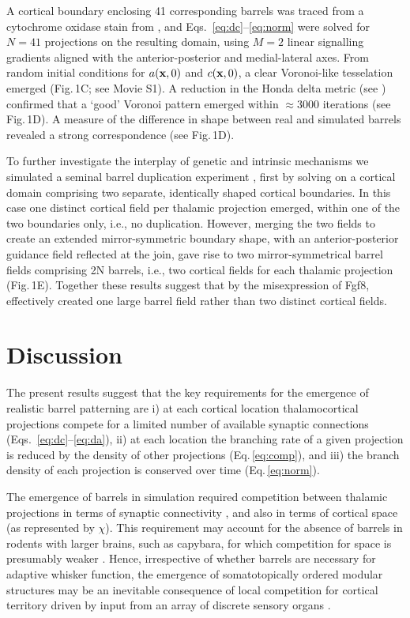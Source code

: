 \documentclass[9pt,lineno]{elife}
\begin{document}
A cortical boundary enclosing 41 corresponding barrels was traced from a
cytochrome oxidase stain from \cite{zheng_signal_2001}, and
Eqs.~\ref{eq:dc}--\ref{eq:norm} were solved for $N=41$ projections on the
resulting domain, using $M=2$ linear signalling gradients aligned with the
anterior-posterior and medial-lateral axes. From random initial conditions for
$a({\bf x},0)$ and $c({\bf x},0)$, a clear Voronoi-like tesselation emerged
(Fig.\,1C; see Movie S1). A reduction in the Honda delta metric (see
\citealp{senft_mouse_1991}) confirmed that a `good' Voronoi pattern emerged
within $\approx 3000$ iterations (see Fig.\,1D). A measure of the difference
in shape between real and simulated barrels revealed a strong correspondence
(see Fig.\,1D).

To further investigate the interplay of genetic and intrinsic mechanisms we
simulated a seminal barrel duplication experiment
\citep{shimogori_fibroblast_2005}, first by solving on a cortical domain
comprising two separate, identically shaped cortical boundaries. In this case
one distinct cortical field per thalamic projection emerged, within one of the
two boundaries only, i.e., no duplication. However, merging the two fields to
create an extended mirror-symmetric boundary shape, with an anterior-posterior
guidance field reflected at the join, gave rise to two mirror-symmetrical
barrel fields comprising 2N barrels, i.e., two cortical fields for each
thalamic projection (Fig.\,1E). Together these results suggest that by the
misexpression of Fgf8, \cite{shimogori_fibroblast_2005}
effectively created one large barrel field rather than two distinct cortical
fields.

\section{Discussion}

The present results suggest that the key requirements for the emergence of
realistic barrel patterning are i) at each cortical location thalamocortical
projections compete for a limited number of available synaptic connections
(Eqs.~\ref{eq:dc}--\ref{eq:da}), ii) at each location the branching rate of a
given projection is reduced by the density of other projections
(Eq.\,\ref{eq:comp}), and iii) the branch density of each projection is
conserved over time (Eq.\,\ref{eq:norm}).

The emergence of barrels in simulation required competition between thalamic
projections in terms of synaptic connectivity , and also in terms of cortical space (as
represented by $\chi$). This requirement may account for the absence of
barrels in rodents with larger brains, such as capybara, for which competition
for space is presumably weaker \citep{woolsey_comparative_1975}. Hence,
irrespective of whether barrels are necessary for adaptive whisker function,
the emergence of somatotopically ordered modular structures may be an
inevitable consequence of local competition for cortical territory driven by
input from an array of discrete sensory organs \citep{purves_iterated_1992}.
\end{document}
